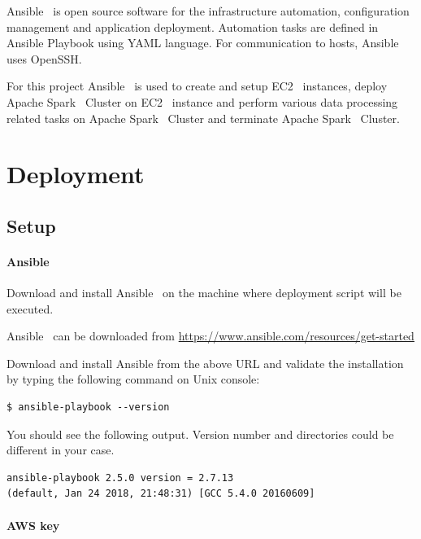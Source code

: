 Ansible~\cite{hid-sp18-511-www-ansible} is open source software for
the infrastructure automation, configuration management and
application deployment. Automation tasks are defined in Ansible
Playbook using YAML language. For communication to hosts,
Ansible~\cite{hid-sp18-511-www-ansible} uses OpenSSH\@.

For this project Ansible~\cite{hid-sp18-511-www-ansible} is used to
create and setup EC2~\cite{hid-sp18-511-www-ec2} instances, deploy
Apache Spark~\cite{hid-sp18-511-www-spark} Cluster on
EC2~\cite{hid-sp18-511-www-ec2} instance and perform various data
processing related tasks on Apache Spark~\cite{hid-sp18-511-www-spark}
Cluster and terminate Apache Spark~\cite{hid-sp18-511-www-spark}
Cluster.

\section{Deployment}

\subsection{Setup}

\paragraph{Ansible}
Download and install Ansible~\cite{hid-sp18-511-www-ansible} on the
machine where deployment script will be executed.

Ansible~\cite{hid-sp18-511-www-ansible} can be downloaded from
\url{https://www.ansible.com/resources/get-started}

Download and install Ansible from the above URL and validate the
installation by typing the following command on Unix console:

\begin{verbatim}
$ ansible-playbook --version
\end{verbatim}

You should see the following output. Version number and directories
could be different in your case.

\begin{verbatim}
ansible-playbook 2.5.0 version = 2.7.13
(default, Jan 24 2018, 21:48:31) [GCC 5.4.0 20160609]
\end{verbatim}

\paragraph{AWS key}

